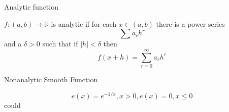 \begin{flashcard}[Definition]{Analytic function}

    $f:(a,b) \to \mathbb{R}$ is analytic if for each $x \in (a,b)$ there is a power series $$\sum a_r h^r$$ and a $\delta > 0$
    such that if $|h| < \delta$ then $$f(x+h) = \sum_{r=0}^\infty a_r h^r$$

\end{flashcard}

\begin{flashcard}[Example]{Nonanalytic Smooth Function}

    $$e(x) = e^{-1/x}, x > 0, e(x) = 0, x \leq 0$$
    could 

\end{flashcard}